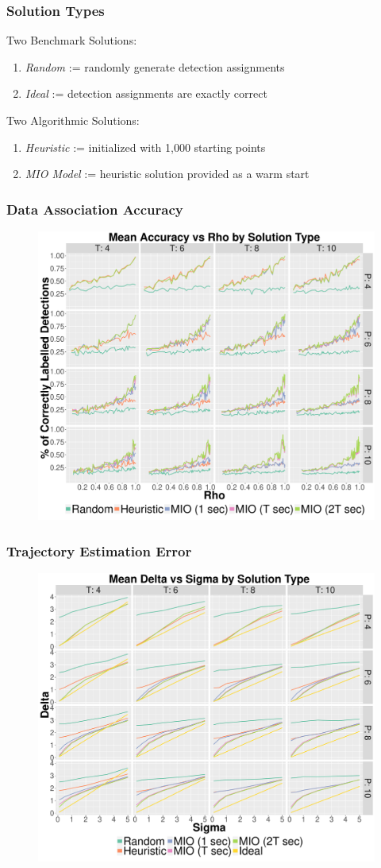 \documentclass{beamer}
\begin{document}
\begin{frame}
\frametitle{Solution Types}
Two Benchmark Solutions:
\begin{enumerate}
\item \textit{Random} := randomly generate detection assignments
\item \textit{Ideal} := detection assignments are exactly correct
\end{enumerate}\vfill
Two Algorithmic Solutions:
\begin{enumerate}
\item \textit{Heuristic} := initialized with 1,000 starting points
\item \textit{MIO Model} := heuristic solution provided as a warm start
\end{enumerate}
\end{frame}

\begin{frame}
\frametitle{Data Association Accuracy}
\begin{figure}[ht]
  \centering
  \includegraphics[width=.7\columnwidth]{../Figures/Basic_Accuracy_Summary}
\end{figure}
\end{frame}

\begin{frame}
\frametitle{Trajectory Estimation Error} 
\begin{figure}[ht]
  \centering
  \includegraphics[width=.7\columnwidth]{../Figures/Basic_Delta_Summary}
\end{figure}
\end{frame}
\end{document}
